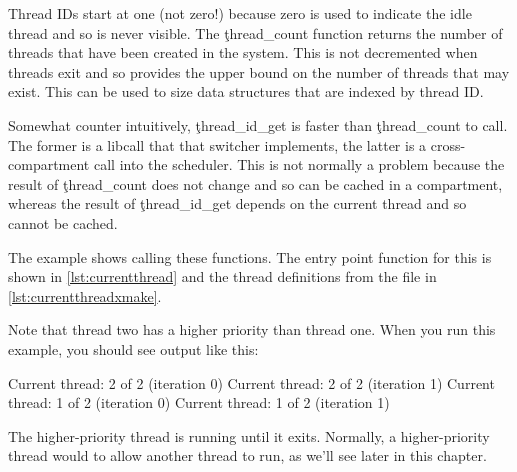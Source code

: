 
Thread IDs start at one (not zero!) because zero is used to indicate the idle thread and so is never visible.
The \c{thread_count} function returns the number of threads that have been created in the system.
This is not decremented when threads exit and so provides the upper bound on the number of threads that may exist.
This can be used to size data structures that are indexed by thread ID.


\begin{caution}
	Somewhat counter intuitively, \c{thread_id_get} is faster than \c{thread_count} to call.
	The former is a libcall that that switcher implements, the latter is a cross-compartment call into the scheduler.
	This is not normally a problem because the result of \c{thread_count} does not change and so can be cached in a compartment, whereas the result of \c{thread_id_get} depends on the current thread and so cannot be cached.
\end{caution}

The  example shows calling these functions.
The entry point function for this is shown in \ref{lst:currentthread} and the thread definitions from the  file in \ref{lst:currentthreadxmake}.

\codelisting[filename=examples/current_thread/current.cc,marker=entry,label=lst:currentthread,caption="A simple example that prints the current thread"]{}

\lualisting[filename=examples/current_thread/xmake.lua,marker=threads,label=lst:currentthreadxmake,caption="The thread definitions for the current-thread example"]{}

Note that thread two has a higher priority than thread one.
When you run this example, you should see output like this:

\begin{console}
Current thread: 2 of 2 (iteration 0)
Current thread: 2 of 2 (iteration 1)
Current thread: 1 of 2 (iteration 0)
Current thread: 1 of 2 (iteration 1)
\end{console}

The higher-priority thread is running until it exits.
Normally, a higher-priority thread would  to allow another thread to run, as we'll see later in this chapter.

